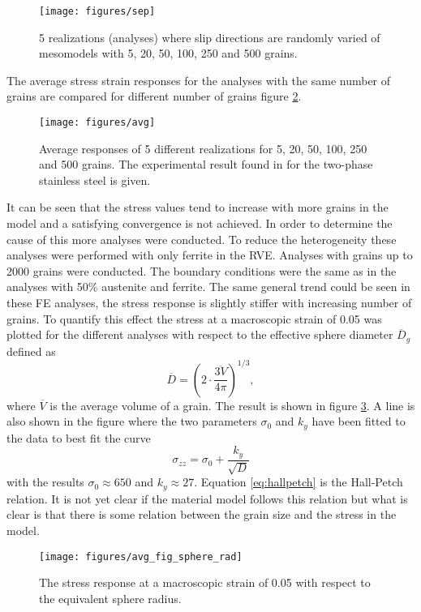 \documentclass[crystal_plast.tex]{subfiles}
\begin{document}
 \begin{figure}[ht]
\centering
\texttt{[image: figures/sep]}
\caption{5 realizations (analyses) where slip directions are randomly varied of mesomodels with 5, 20, 50, 100, 250 and 500 grains.}
\label{fig:sep}
\end{figure}

The average stress strain responses for the analyses with the same number of grains are compared for different number of grains figure \ref{fig:avg}.

\begin{figure}[htpb!]
\centering
\texttt{[image: figures/avg]}
\caption{Average responses of 5 different realizations for 5, 20, 50, 100, 250 and 500 grains. The experimental result found in \cite{lillekh} for the two-phase stainless steel is given.}
\label{fig:avg}
\end{figure}

It can be seen that the stress values tend to increase with more grains in the model and a satisfying convergence is not achieved. In order to determine the cause of this more analyses were conducted. To reduce the heterogeneity these analyses were performed with only ferrite in the RVE. Analyses with grains up to 2000 grains were conducted. The boundary conditions were the same as in the analyses with 50\% austenite and ferrite. The same general trend could be seen in these FE analyses, the stress response is slightly stiffer with increasing number of grains. To quantify this effect the stress at a macroscopic strain of 0.05 was plotted for the different analyses with respect to the effective sphere diameter $\overline{D}_g$ defined as
\begin{equation}
 \overline{D} = \left( 2\cdot \frac{ \overline{3V}}{4 \pi} \right)^{1/3},
\end{equation}
where $\overline{V}$ is the average volume of a grain. The result is shown in figure \ref{fig:avg_sphere_rad}. A line is also shown in the figure where the two parameters $\sigma_0$ and $k_y$ have been fitted to the data to best fit the curve
\begin{equation}
 \sigma_{zz} = \sigma_0 + \frac{k_y}{\sqrt{D}}
 \label{eq:hallpetch}
\end{equation}
with the results $\sigma_0 \approx 650$ and $k_y \approx 27$. Equation \ref{eq:hallpetch} is the Hall-Petch relation. It is not yet clear if the material model follows this relation but what is clear is that there is some relation between the grain size and the stress in the model.

\begin{figure}[htpb!]
\centering
\texttt{[image: figures/avg\_fig\_sphere\_rad]}
\caption{The stress response at a macroscopic strain of 0.05 with respect to the equivalent sphere radius.}
\label{fig:avg_sphere_rad}
\end{figure}
\end{document}
